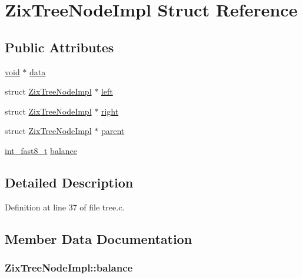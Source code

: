 \hypertarget{struct_zix_tree_node_impl}{}\section{Zix\+Tree\+Node\+Impl Struct Reference}
\label{struct_zix_tree_node_impl}
\subsection*{Public Attributes}
\begin{DoxyCompactItemize}
\item 
\hyperlink{sound_8c_ae35f5844602719cf66324f4de2a658b3}{void} $\ast$ \hyperlink{struct_zix_tree_node_impl_a7ddf48bc6cd34adf669d0a883aca7a6b}{data}
\item 
struct \hyperlink{struct_zix_tree_node_impl}{Zix\+Tree\+Node\+Impl} $\ast$ \hyperlink{struct_zix_tree_node_impl_a038c10ec0d0308a32a04a979adc7701d}{left}
\item 
struct \hyperlink{struct_zix_tree_node_impl}{Zix\+Tree\+Node\+Impl} $\ast$ \hyperlink{struct_zix_tree_node_impl_a5285b1950acea36f82ed91d4cb2cb227}{right}
\item 
struct \hyperlink{struct_zix_tree_node_impl}{Zix\+Tree\+Node\+Impl} $\ast$ \hyperlink{struct_zix_tree_node_impl_a0886e02d15e99c234f39919d82fd4418}{parent}
\item 
\hyperlink{lib-src_2ffmpeg_2win32_2stdint_8h_a880ed9ceb8621521452c81d03bd08cfb}{int\+\_\+fast8\+\_\+t} \hyperlink{struct_zix_tree_node_impl_a9a70c26e565f6dd786969f2a076b5262}{balance}
\end{DoxyCompactItemize}


\subsection{Detailed Description}


Definition at line 37 of file tree.\+c.



\subsection{Member Data Documentation}
\subsubsection[{\texorpdfstring{balance}{balance}}]{ Zix\+Tree\+Node\+Impl\+::balance}\hypertarget{struct_zix_tree_node_impl_a9a70c26e565f6dd786969f2a076b5262}{}\label{struct_zix_tree_node_impl_a9a70c26e565f6dd786969f2a076b5262}


